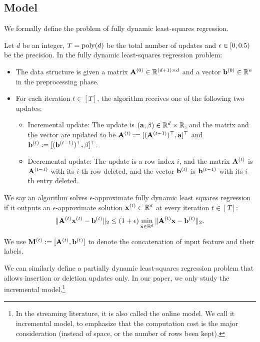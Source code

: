 \subsection{Model}\label{sec:model}
We formally define the problem of fully dynamic least-squares regression.
\begin{definition}\label{def:fully_dynamic_l2_regression}
Let $d$ be an integer, $T = \operatorname{poly}(d)$ be the total number of updates and $\epsilon \in [0,0.5)$ be the precision.
In the fully dynamic least-squares regression problem:
\begin{itemize}
    \item The data structure is given a matrix $\mathbf{A}^{(0)} \in \mathbb{R}^{(d+1) \times d}$ and a vector $\mathbf{b}^{(0)} \in \mathbb{R}^{n}$ in the preprocessing phase.
    \item For each iteration $t \in [T]$, the algorithm receives one of the following two updates:
    \begin{itemize}
    \item Incremental update: The update is $(\mathbf{a}, \beta) \in \mathbb{R}^d \times \mathbb{R}$, and the matrix and the vector are updated to be $\mathbf{A}^{(t)} := [(\mathbf{A}^{(t-1)})^{\top}, \mathbf{a}]^{\top}$ and $\mathbf{b}^{(t)} := [(\mathbf{b}^{(t-1)})^{\top}, \beta]^{\top}$.
    \item Decremental update: The update is a row index $i$, and the matrix $\mathbf{A}^{(t)}$ is $\mathbf{A}^{(t-1)}$ with its $i$-th row deleted, and the vector $\mathbf{b}^{(t)}$ is $\mathbf{b}^{(t-1)}$ with its $i$-th entry deleted.
    \end{itemize}
\end{itemize}
We say an algorithm solves $\epsilon$-approximate fully dynamic least squares regression if it outputs an $\epsilon$-approximate solution $\mathbf{x}^{(t)} \in \mathbb{R}^d$ at every iteration $t \in [T]$:
    \[
    \|\mathbf{A}^{(t)} \mathbf{x}^{(t)} - \mathbf{b}^{(t)}\|_2 \leq (1+\epsilon) \min_{\mathbf{x} \in \mathbb{R}^d} \|\mathbf{A}^{(t)} \mathbf{x} - \mathbf{b}^{(t)} \|_2.
    \]
\end{definition}

We use $\mathbf{M}^{(t)} := [\mathbf{A}^{(t)}, \mathbf{b}^{(t)}]$ to denote the concatenation of input feature and their labels. 

We can similarly define a partially dynamic least-squares regression problem that allows insertion or deletion updates only. In our paper, we only study the incremental model.\footnote{In the streaming literature, it is also called the online model. We call it incremental model, to emphasize that the computation cost is the major consideration (instead of space, or the number of rows been kept).}

